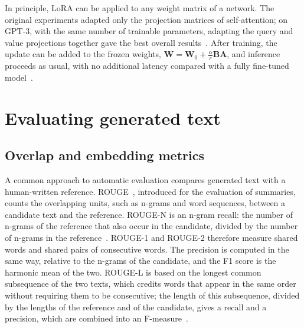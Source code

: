 In principle, LoRA can be applied to any weight matrix of a network. The original experiments adapted only the projection matrices of self-attention; on GPT-3, with the same number of trainable parameters, adapting the query and value projections together gave the best overall results~\cite{hu2022lora}. After training, the update can be added to the frozen weights, $\mathbf{W} = \mathbf{W}_0 + \frac{\alpha}{r}\mathbf{B}\mathbf{A}$, and inference proceeds as usual, with no additional latency compared with a fully fine-tuned model~\cite{hu2022lora}.

\section{Evaluating generated text}
\label{sec:evaluation}

\subsection{Overlap and embedding metrics}
\label{sec:overlap-metrics}

A common approach to automatic evaluation compares generated text with a human-written reference. ROUGE~\cite{lin2004rouge}, introduced for the evaluation of summaries, counts the overlapping units, such as n-grams and word sequences, between a candidate text and the reference. ROUGE-N is an n-gram recall: the number of n-grams of the reference that also occur in the candidate, divided by the number of n-grams in the reference~\cite{lin2004rouge}. ROUGE-1 and ROUGE-2 therefore measure shared words and shared pairs of consecutive words. The precision is computed in the same way, relative to the n-grams of the candidate, and the F1 score is the harmonic mean of the two. ROUGE-L is based on the longest common subsequence of the two texts, which credits words that appear in the same order without requiring them to be consecutive; the length of this subsequence, divided by the lengths of the reference and of the candidate, gives a recall and a precision, which are combined into an F-measure~\cite{lin2004rouge}.

